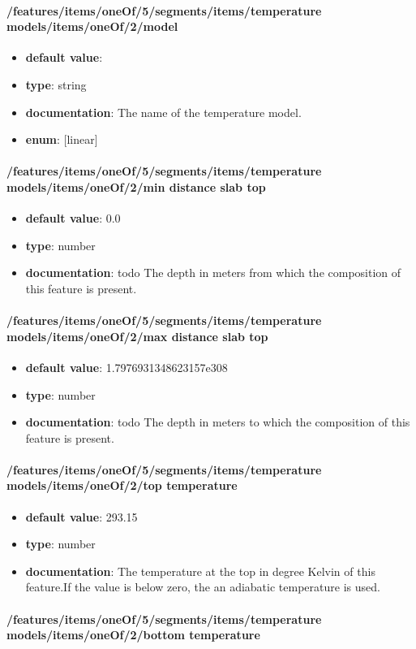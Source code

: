 \paragraph{/features/items/oneOf/5/segments/items/temperature models/items/oneOf/2/model}
\begin{itemize}\item {\bf default value}: 
\item {\bf type}: string
\item {\bf documentation}: The name of the temperature model.
\item {\bf enum}: [linear]\end{itemize}\paragraph{/features/items/oneOf/5/segments/items/temperature models/items/oneOf/2/min distance slab top}
\begin{itemize}\item {\bf default value}: 0.0
\item {\bf type}: number
\item {\bf documentation}: todo The depth in meters from which the composition of this feature is present.
\end{itemize}\paragraph{/features/items/oneOf/5/segments/items/temperature models/items/oneOf/2/max distance slab top}
\begin{itemize}\item {\bf default value}: 1.7976931348623157e308
\item {\bf type}: number
\item {\bf documentation}: todo The depth in meters to which the composition of this feature is present.
\end{itemize}\paragraph{/features/items/oneOf/5/segments/items/temperature models/items/oneOf/2/top temperature}
\begin{itemize}\item {\bf default value}: 293.15
\item {\bf type}: number
\item {\bf documentation}: The temperature at the top in degree Kelvin of this feature.If the value is below zero, the an adiabatic temperature is used.
\end{itemize}\paragraph{/features/items/oneOf/5/segments/items/temperature models/items/oneOf/2/bottom temperature}

